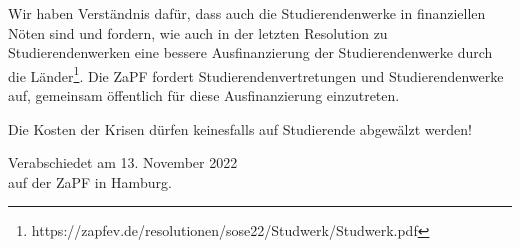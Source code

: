 \documentclass[DIV=calc]{scrartcl}
\let\oldgrqq=\grqq
\def\grqq{\oldgrqq\xspace}
\begin{document}
Wir haben Verständnis dafür, dass auch die Studierendenwerke in finanziellen Nöten sind und fordern, wie auch in der letzten \glqq Resolution zu Studierendenwerken\grqq eine bessere Ausfinanzierung der Studierendenwerke durch die Länder\footnote{https://zapfev.de/resolutionen/sose22/Studwerk/Studwerk.pdf}. Die ZaPF fordert Studierendenvertretungen und Studierendenwerke auf, gemeinsam öffentlich für diese Ausfinanzierung einzutreten.

Die Kosten der Krisen dürfen keinesfalls auf Studierende abgewälzt werden!
    
\vspace{1cm} 

\vfill
\begin{flushright}
	Verabschiedet am 13. November 2022 \\
	auf der ZaPF in Hamburg.
\end{flushright}
\end{document}
